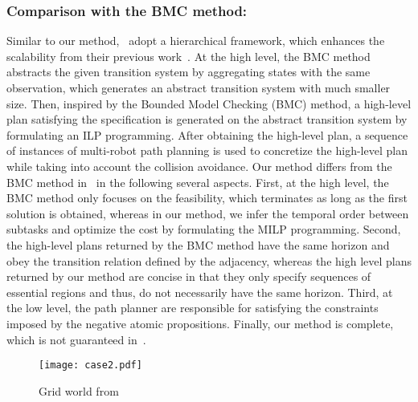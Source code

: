 \documentclass[Afour,sageh,times]{sagej}
\begin{document}
{{\subsubsection{Comparison with the BMC method:}
Similar to our method,~\cite{sahin2019multi} adopt a hierarchical framework, which enhances the scalability from their previous work~\cite{sahin2017synchronous,sahin2019multirobot}. At the high level, the BMC  method abstracts the given transition system by aggregating states with the same observation, which generates an abstract transition system with much smaller size. Then, inspired by the Bounded Model Checking (BMC) method,  a high-level plan satisfying the specification is generated on the abstract transition system by formulating an ILP programming. After obtaining the high-level plan, a sequence of instances of  multi-robot path planning is used to concretize the high-level plan while taking into account the collision avoidance. Our method differs from the BMC method in~\cite{sahin2019multi} in the following several aspects. First, at the high level, the BMC method only focuses on the feasibility, which terminates as long as the first solution is obtained, whereas in our method, we infer the temporal order between subtasks and optimize the cost by formulating the MILP programming. Second, the high-level plans returned by the BMC method have the same horizon and obey the transition relation defined by the adjacency, whereas the high level plans returned by our method are concise in that they only specify sequences of essential regions and thus, do not necessarily have the same horizon. Third, at the low level, the path planner are responsible for satisfying the constraints imposed by the negative atomic propositions. Finally, our method is complete,  which is not guaranteed in~\cite{sahin2019multi}.
 \begin{figure}[!t]
    \centering
    \texttt{[image: case2.pdf]}
    \caption{Grid world from~\cite{sahin2019multi}}\label{fig:scalability}
 \end{figure}


}}
\end{document}
